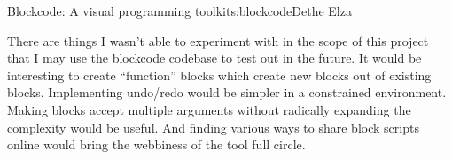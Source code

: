 \begin{aosachapter}{Blockcode: A visual programming toolkit}{s:blockcode}{Dethe Elza}
\label{a-program-is-a-process-not-a-thing}

There are things I wasn't able to experiment with in the scope of this
project that I may use the blockcode codebase to test out in the future.
It would be interesting to create ``function'' blocks which create new
blocks out of existing blocks. Implementing undo/redo would be simpler
in a constrained environment. Making blocks accept multiple arguments
without radically expanding the complexity would be useful. And finding
various ways to share block scripts online would bring the webbiness of
the tool full circle.

\end{aosachapter}
